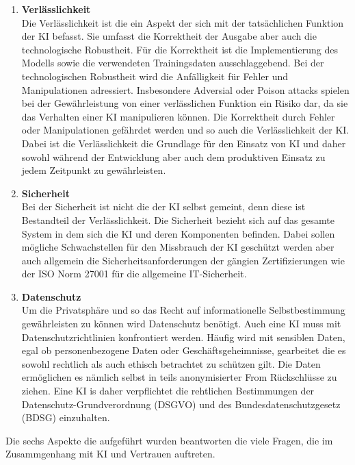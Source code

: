 \begin{onehalfspace}
\begin{enumerate}
            \item \textbf{Verlässlichkeit} \\
            Die Verlässlichkeit ist die ein Aspekt der sich mit der tatsächlichen Funktion der \ac*{KI} befasst. Sie umfasst die Korrektheit der Ausgabe aber auch die technologische Robustheit. Für die Korrektheit ist die Implementierung des Modells sowie die verwendeten Trainingsdaten ausschlaggebend. Bei der technologischen Robustheit wird die Anfälligkeit für Fehler und Manipulationen adressiert. Insbesondere Adversial oder Poison attacks spielen bei der Gewährleistung von einer verlässlichen Funktion ein Risiko dar, da sie das Verhalten einer \ac*{KI} manipulieren können. Die Korrektheit durch Fehler oder Manipulationen gefährdet werden und so auch die Verlässlichkeit der \ac{KI}. Dabei ist die Verlässlichkeit die Grundlage für den Einsatz von \ac*{KI} und daher sowohl während der Entwicklung aber auch dem produktiven Einsatz zu jedem Zeitpunkt zu gewährleisten. \cite{Cremers2019}\cite{Hallensleben2020}
            \item \textbf{Sicherheit} \\
            Bei der Sicherheit ist nicht die der \ac*{KI} selbst gemeint, denn diese ist Bestandteil der Verlässlichkeit. Die Sicherheit bezieht sich auf das gesamte System in dem sich die \ac*{KI} und deren Komponenten befinden. Dabei sollen mögliche Schwachstellen für den Missbrauch der \ac*{KI} geschützt werden aber auch allgemein die Sicherheitsanforderungen der gängien Zertifizierungen wie der ISO Norm 27001 für die allgemeine IT-Sicherheit.  \cite{Cremers2019}
            \item \textbf{Datenschutz} \\
            Um die Privatsphäre und so das Recht auf informationelle Selbstbestimmung gewährleisten zu können wird Datenschutz benötigt. Auch eine \ac*{KI} muss mit Datenschutzrichtlinien konfrontiert werden. Häufig wird mit sensiblen Daten, egal ob personenbezogene Daten oder Geschäftsgeheimnisse, gearbeitet die es sowohl rechtlich als auch ethisch betrachtet zu schützen gilt. Die Daten ermöglichen es nämlich selbst in teils anonymisierter From Rückschlüsse zu ziehen. Eine \ac*{KI} is daher verpflichtet die rehtlichen Bestimmungen der Datenschutz-Grundverordnung (DSGVO) und des Bundesdatenschutzgesetz (BDSG) einzuhalten. \cite{Cremers2019}
        \end{enumerate}
        Die sechs Aspekte die aufgeführt wurden beantworten die viele Fragen, die im Zusammgenhang mit \ac*{KI} und Vertrauen auftreten.

\end{onehalfspace}
